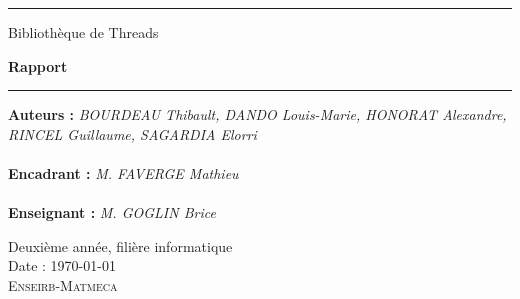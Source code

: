 \thispagestyle{empty}

\hrule
\begin{flushleft}
\Huge{Bibliothèque de Threads}\\
\end{flushleft}
\begin{flushright}
\huge\textbf{Rapport}\\
\end{flushright}
\hrule

\noindent\textbf{Auteurs :}
\emph{BOURDEAU Thibault, DANDO Louis-Marie, HONORAT Alexandre, RINCEL Guillaume, SAGARDIA Elorri}\\
\\
\noindent\textbf{Encadrant :}
\emph{M. FAVERGE Mathieu}\\
\\
\noindent\textbf{Enseignant :}
\emph{M. GOGLIN Brice} 

\normalsize
\begin{center}
  Deuxième année, filière informatique\\
  Date : \today\\
  \textsc{Enseirb-Matmeca}
\end{center}
